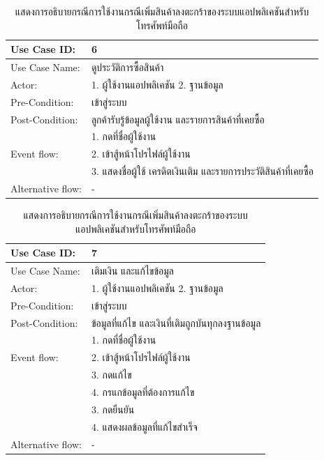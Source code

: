 \begin{table}[htbp]
  \centering
  \caption{แสดงการอธิบายกรณีการใช้งานกรณีเพิ่มสินค้าลงตะกร้าของระบบแอปพลิเคชันสำหรับโทรศัพท์มือถือ}
  \label{tab:example}
  \begin{tabularx}{\textwidth}{|p{3cm}|X|}
      \hline
      \multirow{1}{3cm}{Use Case ID:} & 6 \\
      \hline
      \multirow{1}{3cm}{Use Case Name:} & ดูประวัติการซื้อสินค้า \\
      \hline
      \multirow{1}{3cm}{Actor:} & 1. ผู้ใช้งานแอปพลิเคชัน 2. ฐานข้อมูล \\
      \hline
      \multirow{1}{3cm}{Pre-Condition:} & เข้าสู่ระบบ \\ 
      \hline
      \multirow{1}{3cm}{Post-Condition:} & ลูกค้ารับรู้ข้อมูลผู้ใช้งาน และรายการสินค้าที่เคยซื้อ \\
      \hline
      \multirow{3}{3cm}{Event flow:} & 1. กดที่ชื่อผู้ใช้งาน \\ 
      & 2. เข้าสู้หน้าโปรไฟล์ผู้ใช้งาน \\ & 3. แสดงชื่อผู้ใช้ เครดิตเงินเติม และรายการประวัติสินค้าที่เคยซื้อ \\
      \hline
      \multirow{1}{3cm}{Alternative flow:} & - \\
      \hline
  \end{tabularx}
\end{table}

\begin{table}[htbp]
  \centering
  \caption{แสดงการอธิบายกรณีการใช้งานกรณีเพิ่มสินค้าลงตะกร้าของระบบแอปพลิเคชันสำหรับโทรศัพท์มือถือ}
  \label{tab:example}
  \begin{tabularx}{\textwidth}{|p{3cm}|X|}
      \hline
      \multirow{1}{3cm}{Use Case ID:} & 7 \\
      \hline
      \multirow{1}{3cm}{Use Case Name:} & เติมเงิน และแก้ไขข้อมูล \\
      \hline
      \multirow{1}{3cm}{Actor:} & 1. ผู้ใช้งานแอปพลิเคชัน 2. ฐานข้อมูล \\
      \hline
      \multirow{1}{3cm}{Pre-Condition:} & เข้าสู่ระบบ \\ 
      \hline
      \multirow{1}{3cm}{Post-Condition:} & ข้อมูลที่แก้ไข และเงินที่เติมถูกบันทุกลงฐานข้อมูล \\
      \hline
      \multirow{3}{3cm}{Event flow:} & 1. กดที่ชื่อผู้ใช้งาน \\ 
      & 2. เข้าสู้หน้าโปรไฟล์ผู้ใช้งาน \\ & 3. กดแก้ไข \\
      & 4. กรแกข้อมูลที่ต้องการแก้ไข \\ & 3. กดยืนยัน \\
      & 4. แสดงผลข้อมูลที่แก้ไขสำเร็จ \\
      \hline
      \multirow{1}{3cm}{Alternative flow:} & - \\
      \hline
  \end{tabularx}
\end{table}

